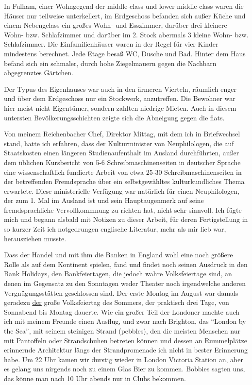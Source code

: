 In Fulham, einer Wohngegend der middle-class und lower middle-class waren die Häuser nur teilweise unterkellert, im Erdgeschoss befanden sich außer Küche und einem Nebengelass ein großes Wohn- und Esszimmer, darüber drei kleinere Wohn- bzw. Schlafzimmer und darüber im 2. Stock abermals 3 kleine Wohn- bzw. Schlafzimmer. Die Einfamilienhäuser waren in der Regel für vier Kinder mindestens berechnet. Jede Etage besaß WC, Dusche und Bad. Hinter dem Haus befand sich ein schmaler, durch hohe Ziegelmauern gegen die Nachbarn abgegrenztes Gärtchen.

Der Typus des Eigenhauses war auch in den ärmeren Vierteln, räumlich enger und über dem Erdgeschoss nur ein Stockwerk, anzutreffen. Die Bewohner war hier meist nicht Eigentümer, sondern zahlten niedrige Mieten. Auch in diesem untersten Bevölkerungsschichten zeigte sich die Abneigung gegen die flats.

Von meinem Reichenbacher Chef, Direktor Mittag, mit dem ich in Briefwechsel stand, hatte ich erfahren, dass der Kulturminister von Neuphilologen, die auf Staatskosten einen längeren Studienaufenthalt im Ausland durchführten, außer dem üblichen Kursbericht von 5-6 Schreibmaschinenseiten in deutscher Sprache eine wissenschaftlich fundierte Arbeit von etwa 25-30 Schreibmaschinenseiten in der betreffenden Fremdsprache über ein selbstgewähltes kulturkundliches Thema erwartete. Diese ministerielle Verfügung war natürlich für einen Neuphilologen, der zum 1. Mal im Ausland ist und sein Hauptaugenmerk auf seine fremdsprachliche Vervollkommnung zu richten hat, nicht sehr sinnvoll. Ich fügte mich und begann alsbald mit Notizen zu dieser Arbeit, für deren Fertigstellung in so kurzer Zeit ich notgedrungen englische Literatur, mehr als mir lieb war, herausziehen musste.

Dass der Handel und mit ihm die Banken in England wohl eine noch größere Rolle als auf dem Kontinent spielen, fand und findet noch seinen Ausdruck in den Bank Holidays, den Bankfeiertagen, die jedoch wahre Volksfeiertage sind, an denen im Gegensatz zu den Sonntagen weder Theater noch irgendwelche anderen Vergnügungsstätten geschlossen sind. Der erste Montag im August war damals geradezu \underline{der} große Volksfeiertag des Sommers, der praktisch drei Tage, von Sonnabend bis Montag dauerte. Wie ein großer Teil der Londoner machte auch ich mit meinem Freunde einen Ausflug, und zwar nach Brighton, das \enquote{London by the Sea}, mit seinem steinigen Strand (pebbles), den die meisten Menschen nur mit Pantoffeln oder Strandschuhen betreten können und dessen an Rummelplätze erinnernde Architektur längs der Strandpromenade ich nicht in bester Erinnerung habe. Um 22 Uhr kamen wir durstig wieder in London Victoria Station an, aber es gelang uns nirgends noch zu einem Glas Bier zu kommen. Bobbies sagten uns, das könne man nach 10 Uhr abends nur in Clubs bekommen.


